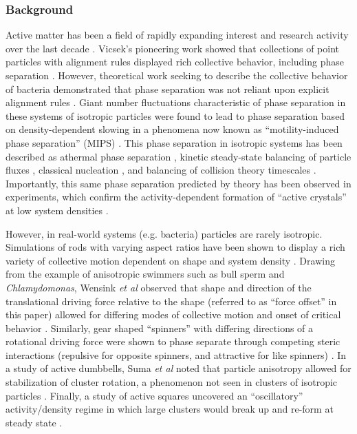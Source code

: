 \subsubsection*{Background}

Active matter has been a field of rapidly expanding interest and research activity over the last decade \cite{Ramaswamy_2010_AnnRevConMatPhys,MarchettiEA_2013_RevModPhys,BechingerEA_2016_RevModPhys,MarchettiEA_2016_CurrentOpinionColloidInterfaceScience}.
Vicsek's pioneering work showed that collections of point particles with alignment rules displayed rich collective behavior, including phase separation \cite{VicsekEA_1995_PRL}.
However, theoretical work seeking to describe the collective behavior of bacteria demonstrated that phase separation was not reliant upon explicit alignment rules \cite{Cates_2010_PNAS}.
Giant number fluctuations characteristic of phase separation in these systems of isotropic particles were found to lead to phase separation based on density-dependent slowing in a phenomena now known as ``motility-induced phase separation'' (MIPS) \cite{CatesTailleur_2013_EPL}. 
This phase separation in isotropic systems has been described as athermal phase separation \cite{FilyMarchetti_2012_PRL}, kinetic steady-state balancing of particle fluxes \cite{RednerEA_2013_PRE, RednerEA_2013_PRL}, classical nucleation \cite{Richard_2016_SoftMatter,Redner_2016_PRL}, and balancing of collision theory timescales \cite{Bruss_2017_arxiv}.
Importantly, this same phase separation predicted by theory has been observed in experiments, which confirm the activity-dependent formation of ``active crystals'' at low system densities \cite{PalacciEA_2013_Science,PetroffEA_2015_PRL}.

However, in real-world systems (e.g. bacteria) particles are rarely isotropic.
Simulations of rods with varying aspect ratios have been shown to display a rich variety of collective motion dependent on shape and system density \cite{WensinkLoewen_2012_JPhysConMat,YangEA_2010_PRE}.
Drawing from the example of anisotropic swimmers such as bull sperm and \textit{Chlamydomonas}, Wensink \textit{et al} observed that shape and direction of the translational driving force relative to the shape (referred to as ``force offset'' in this paper) allowed for differing modes of collective motion and onset of critical behavior \cite{Wensink_2014}.
Similarly, gear shaped ``spinners'' with differing directions of a rotational driving force were shown to phase separate through competing steric interactions (repulsive for opposite spinners, and attractive for like spinners) \cite{NguyenEA_2014_PRL, SabrinaEA_2015_SoftMatter, SpellingsEA_2015_PNAS}.
In a study of active dumbbells, Suma \textit{et al} noted that particle anisotropy allowed for stabilization of cluster rotation, a phenomenon not seen in clusters of isotropic particles \cite{SumaEA_2014_EPL}.
Finally, a study of active squares uncovered an ``oscillatory'' activity/density regime in which large clusters would break up and re-form at steady state \cite{PrymidisEA_2016_SoftMatter}. 

